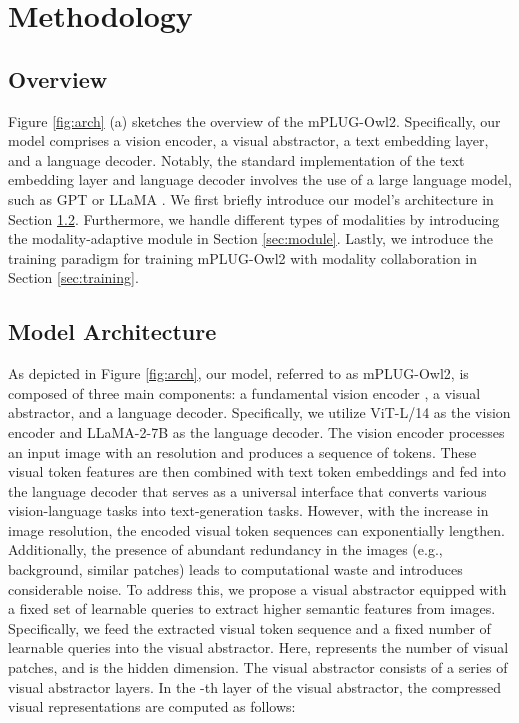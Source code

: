 \documentclass[10pt,twocolumn,letterpaper]{article}
\newcommand{\modelname}{mPLUG-Owl2\xspace}
\begin{document}
\vspace{-1ex}
\section{Methodology}
\subsection{Overview}
Figure \ref{fig:arch} (a) sketches the overview of the \modelname. Specifically, our model comprises a vision encoder, a visual abstractor, a text embedding layer, and a language decoder. Notably, the standard implementation of the text embedding layer and language decoder involves the use of a large language model, such as GPT \cite{Brown2020gpt3} or LLaMA \cite{Touvron2023LLaMA}. We first briefly introduce our model's architecture in Section \ref{sec:arch}. Furthermore, we handle different types of modalities by introducing the modality-adaptive module in Section \ref{sec:module}. Lastly, we introduce the training paradigm for training \modelname with modality collaboration in Section \ref{sec:training}.

\subsection{Model Architecture}\label{sec:arch}
As depicted in Figure \ref{fig:arch}, our model, referred to as \modelname, is composed of three main components: a fundamental vision encoder \cite{radford2021clip}, a visual abstractor, and a language decoder. Specifically, we utilize ViT-L/14 as the vision encoder and LLaMA-2-7B \cite{Touvron2023Llama2} as the language decoder. The vision encoder processes an input image with an  resolution and produces a sequence of  tokens. These visual token features are then combined with text token embeddings and fed into the language decoder that serves as a universal interface that converts various vision-language tasks into text-generation tasks. 
However, with the increase in image resolution, the encoded visual token sequences can exponentially lengthen. Additionally, the presence of abundant redundancy in the images (e.g., background, similar patches) leads to computational waste and introduces considerable noise. To address this, we propose a visual abstractor equipped with a fixed set of learnable queries to extract higher semantic features from images. Specifically, we feed the extracted visual token sequence  and a fixed number of  learnable queries  into the visual abstractor. Here,  represents the number of visual patches, and  is the hidden dimension. The visual abstractor consists of a series of visual abstractor layers. In the -th layer of the visual abstractor, the compressed visual representations  are computed as follows:
\end{document}
